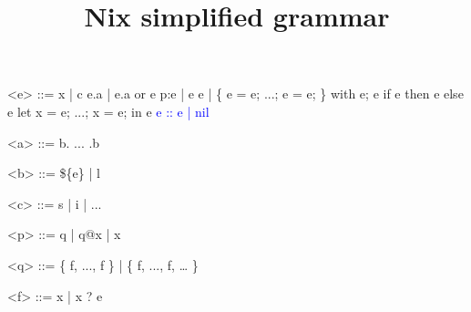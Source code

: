 \documentclass{article}
\title{Nix simplified grammar}
\date{}
\begin{document}
\maketitle{}

\begin{grammar}
<e> ::=
    x | c
  \alt e.a | e.a or e
  \alt p:e | e e
  \alt [ e ... e ] | \{ e = e; ...; e = e; \}
  \alt with e; e
  \alt if e then e else e
  \alt let x = e; ...; x = e; in e
  \textcolor{blue}{\alt e :: e | nil}

<a> ::= b. ... .b

<b> ::= \$\{e\} | l

<c> ::= s | i | ...

<p> ::= q | q@x | x

<q> ::= \{ f, ..., f \} | \{ f, ..., f, … \}

<f> ::= x | x ? e

\end{grammar}
\end{document}

